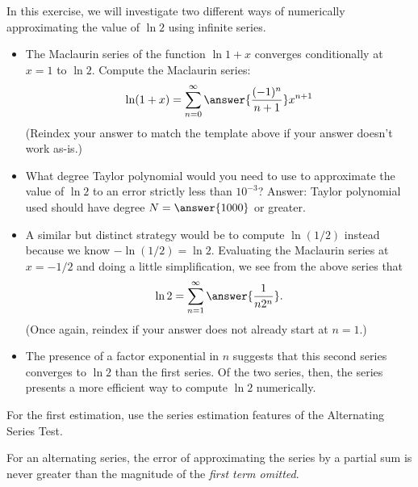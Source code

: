 \documentclass{ximera}
\begin{document}
\begin{exercise}
In this exercise, we will investigate two different ways of numerically approximating the value of $\ln 2$ using infinite series.
\begin{itemize}
\item The Maclaurin series of the function $\ln 1 + x$ converges conditionally at $x = 1$ to $\ln 2$. Compute the Maclaurin series: 
\[ \ln (1 + x) = \sum_{n=0}^\infty \answer{\frac{(-1)^n}{n+1}} x^{n+1} \]
(Reindex your answer to match the template above if your answer doesn't work as-is.)
\item  What degree Taylor polynomial would you need to use to approximate the value of $\ln 2$ to an error strictly less than $10^{-3}$? Answer: Taylor polynomial used should have degree $N = \answer{1000}$ or greater.
\item A similar but distinct strategy would be to compute $\ln (1/2)$ instead because we know $- \ln (1/2)  = \ln 2$. Evaluating the Maclaurin series at $x=-1/2$ and doing a little simplification, we see from the above series that
\[ \ln 2 = \sum_{n=1}^\infty \answer{\frac{1}{n 2^n}}. \]
(Once again, reindex if your answer does not already start at $n=1$.)
\item The presence of a factor exponential in $n$ suggests that this second series converges to $\ln 2$  than the first series. Of the two series, then, the  series presents a more efficient way to compute $\ln 2$ numerically.
\end{itemize}
\begin{hint}
For the first estimation, use the series estimation features of the Alternating Series Test.
\begin{hint}
For an alternating series, the error of approximating the series by a partial sum is never greater than the magnitude of the \textit{first term omitted}.
\end{hint}
\end{hint}
\end{exercise}
\end{document}
